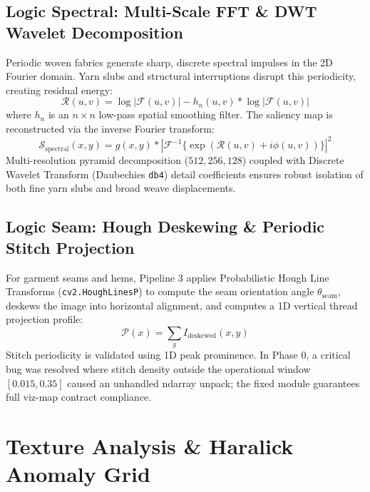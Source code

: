 \documentclass[10pt,a4paper]{article}
\begin{document}
\subsection{Logic Spectral: Multi-Scale FFT \& DWT Wavelet Decomposition}
Periodic woven fabrics generate sharp, discrete spectral impulses in the 2D Fourier domain. Yarn slubs and structural interruptions disrupt this periodicity, creating residual energy:
\begin{equation}
\mathcal{R}(u, v) = \log |\mathcal{F}(u, v)| - h_n(u, v) * \log |\mathcal{F}(u, v)|
\end{equation}
where $h_n$ is an $n \times n$ low-pass spatial smoothing filter. The saliency map is reconstructed via the inverse Fourier transform:
\begin{equation}
\mathcal{S}_{\text{spectral}}(x, y) = g(x, y) * |\mathcal{F}^{-1}\{\exp(\mathcal{R}(u, v) + i\phi(u, v))\}|^2
\end{equation}
Multi-resolution pyramid decomposition ($512, 256, 128$) coupled with Discrete Wavelet Transform (Daubechies \texttt{db4}) detail coefficients ensures robust isolation of both fine yarn slubs and broad weave displacements.

\subsection{Logic Seam: Hough Deskewing \& Periodic Stitch Projection}
For garment seams and hems, Pipeline 3 applies Probabilistic Hough Line Transforms (\texttt{cv2.HoughLinesP}) to compute the seam orientation angle $\theta_{\text{seam}}$, deskews the image into horizontal alignment, and computes a 1D vertical thread projection profile:
\begin{equation}
\mathcal{P}(x) = \sum_{y} I_{\text{deskewed}}(x, y)
\end{equation}
Stitch periodicity is validated using 1D peak prominence. In Phase 0, a critical bug was resolved where stitch density outside the operational window $[0.015, 0.35]$ caused an unhandled ndarray unpack; the fixed module guarantees full viz-map contract compliance.

\section{Texture Analysis \& Haralick Anomaly Grid}
\end{document}
